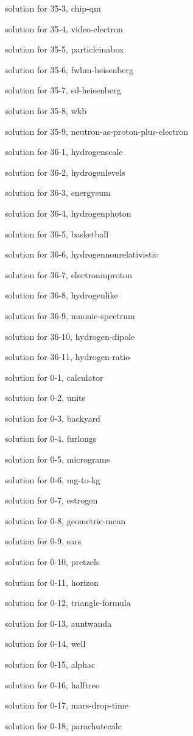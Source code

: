 \documentclass{problems}
\begin{document}
solution for 35-3, chip-qm

solution for 35-4, video-electron

solution for 35-5, particleinabox

solution for 35-6, fwhm-heisenberg

solution for 35-7, sd-heisenberg

solution for 35-8, wkb

solution for 35-9, neutron-as-proton-plus-electron

solution for 36-1, hydrogenscale

solution for 36-2, hydrogenlevels

solution for 36-3, energysum

solution for 36-4, hydrogenphoton

solution for 36-5, basketball

solution for 36-6, hydrogennonrelativistic

solution for 36-7, electroninproton

solution for 36-8, hydrogenlike

solution for 36-9, muonic-spectrum

solution for 36-10, hydrogen-dipole

solution for 36-11, hydrogen-ratio

solution for 0-1, calculator

solution for 0-2, units

solution for 0-3, backyard

solution for 0-4, furlongs

solution for 0-5, micrograms

solution for 0-6, mg-to-kg

solution for 0-7, estrogen

solution for 0-8, geometric-mean

solution for 0-9, sars

solution for 0-10, pretzels

solution for 0-11, horizon

solution for 0-12, triangle-formula

solution for 0-13, auntwanda

solution for 0-14, well

solution for 0-15, alphac

solution for 0-16, halftree

solution for 0-17, mars-drop-time

solution for 0-18, parachutecalc
\end{document}
